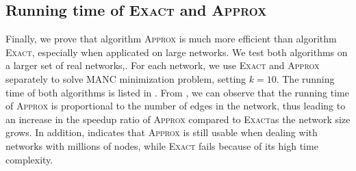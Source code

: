 \documentclass[sigconf]{acmart}
\begin{document}
\subsection{Running time of \textsc{Exact} and \textsc{Approx}}

Finally, we prove that algorithm \textsc{Approx} is much more efficient than algorithm \textsc{Exact}, especially when applicated on large networks.
We test both algorithms on a larger set of real networks,.
For each network, we use \textsc{Exact} and \textsc{Approx} separately to solve MANC minimization problem, setting \(k=10\).
The running time of both algorithms is listed in .
From , we can observe that the running time of \textsc{Approx} is proportional to the number of edges in the network, thus leading to an increase in the speedup ratio of \textsc{Approx} compared to \textsc{Exact}as the network size grows.
In addition,  indicates that \textsc{Approx} is still usable when dealing with networks with millions of nodes, while \textsc{Exact} fails because of its high time complexity.
\end{document}
